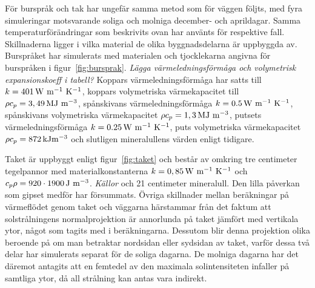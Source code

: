 För burspråk och tak har ungefär samma metod som för väggen följts, med fyra simuleringar motsvarande soliga och
molniga december- och aprildagar. Samma temperaturförändringar som beskrivits ovan har använts för
respektive fall. Skillnaderna ligger i vilka material de olika byggnadsdelarna är uppbyggda av.
Burspråket har simulerats med materialen och tjocklekarna angivna för burspråken i figur~\ref{fig:bursprak}. \emph{\color{red} Lägga värmeledningsförmåga och volymetrisk expansionskoeff i tabell?}
Koppars värmeledningsförmåga har satts till $k=\unit[401]{W~m^{-1}~K^{-1}}$, koppars volymetriska värmekapacitet till $\rho c_p = \unit[3,49]{MJ~m^{-3}}$, spånskivans värmeledningsförmåga $k = \unit[0.5]{W~m^{-1}~K^{-1}}$, spånskivans volymetriska
värmekapacitet $\rho c_p = \unit[1,3]{MJ~m^{-3}}$, putsets värmeledningsförmåga $k = \unit[0.25]{W~m^{-1}~K^{-1}}$, puts volymetriska
värmekapacitet $\rho c_p = \unit[872]{kJm^{-3}}$ och slutligen mineralullens värden
enligt tidigare.
\cite{engineeringcom}\cite{kandidatarbete2010}\cite{engineeringtoolboxthermalconductivity}\cite{engineeringtoolboxspecificheat}

Taket är uppbyggt enligt figur~\ref{fig:taket} och består av omkring tre centimeter tegelpannor med materialkonstanterna $k = \unit[0,85]{W~m^{-1}~K^{-1}}$ och $c_p\rho = \unit[920\cdot 1900]{J~m^{-3}}$.
\emph{\color{red} Källor} och 21 centimeter mineralull. Den lilla påverkan som gipset medför har försummats. Övriga skillnader mellan beräkningar på värmeflödet genom taket och väggarna härstammar från det faktum att solstrålningens normalprojektion är annorlunda på taket jämfört med vertikala ytor, något som tagits med i beräkningarna. Dessutom blir denna projektion olika beroende på om man betraktar nordsidan eller sydsidan av taket, varför dessa två delar har simulerats separat för de soliga dagarna. De molniga dagarna har det däremot antagits att en femtedel av den maximala solintensiteten infaller på samtliga ytor, då all strålning kan antas vara indirekt.


